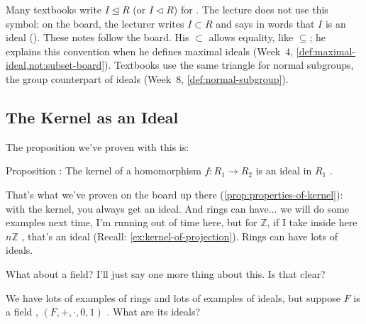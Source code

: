 \begin{aiNote}
Many textbooks write $I \trianglelefteq R$ (or $I \lhd R$) for . The lecture does not use this symbol: on the board, the lecturer writes $I \subset R$ and says in words that $I$ is an ideal (). These notes follow the board. His $\subset$ allows equality, like $\subseteq$; he explains this convention when he defines maximal ideals (Week~4, \cref{def:maximal-ideal,not:subset-board}). Textbooks use the same triangle for normal subgroups, the group counterpart of ideals (Week~8, \cref{def:normal-subgroup}).
\end{aiNote}

\subsection{The Kernel as an Ideal}

\begin{speech}[00:38:07 - 00:39:13]
The proposition we've proven with this is:

Proposition : The kernel of a homomorphism $f \colon R_1 \to R_2$  is an ideal  in $R_1$ .

That's what we've proven on the board up there (\cref{prop:properties-of-kernel}): with the kernel, you always get an ideal. And rings can have... we will do some examples next time, I'm running out of time here, but for $\mathbb{Z}$, if I take inside here $n\mathbb{Z}$ , that's an ideal (Recall: \cref{ex:kernel-of-projection}). Rings can have lots of ideals.

What about a field? I'll just say one more thing about this. Is that clear?

We have lots of examples of rings and lots of examples of ideals, but suppose $F$ is a field , $(F, +, \cdot, 0, 1)$ . What are its ideals? 
\end{speech}

